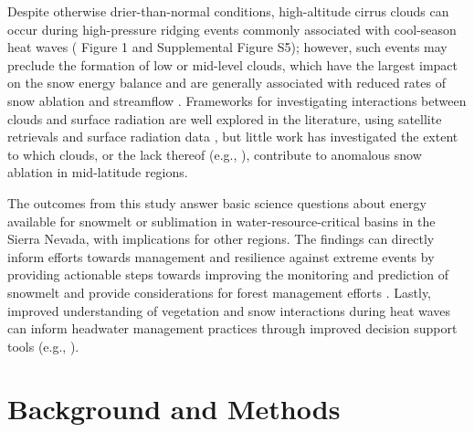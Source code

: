 \documentclass[draft]{agujournal2019}
\begin{document}
Despite otherwise drier-than-normal conditions, high-altitude cirrus clouds can occur during high-pressure ridging events commonly associated with cool-season heat waves ( Figure 1 and Supplemental Figure S5); however, such events may preclude the formation of low or mid-level clouds, which have the largest impact on the snow energy balance \cite{Rudisill2025-cx} and are generally associated with reduced rates of snow ablation and streamflow \cite{Sumargo2018-zf}.
Frameworks for investigating interactions between clouds and surface radiation are well explored in the literature, using satellite retrievals and surface radiation data \cite{Ramanathan1989-pa, Shupe2004-kl, L-Ecuyer2019-my}, but little work has investigated the extent to which clouds, or the lack thereof (e.g., ), contribute to anomalous snow ablation in mid-latitude regions.

The outcomes from this study answer basic science questions about energy available for snowmelt or sublimation in water-resource-critical basins in the Sierra Nevada, with implications for other regions.
The findings can directly inform efforts towards management and resilience against extreme events by providing actionable steps towards improving the monitoring and prediction of snowmelt and provide considerations for forest management efforts \cite{Harpold2020-rc}.
Lastly, improved understanding of vegetation and snow interactions during heat waves can inform headwater management practices through improved decision support tools (e.g., ).


\section{Background and Methods}
\end{document}
